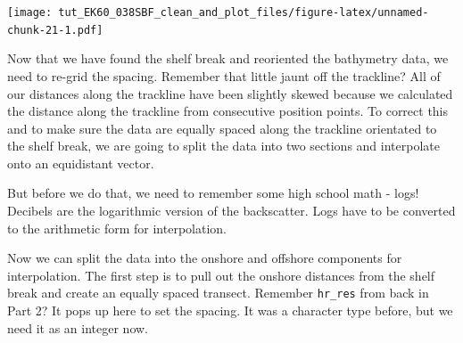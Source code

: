 \documentclass[]{article}
\newenvironment{Shaded}{\begin{snugshade}}{\end{snugshade}}
\newcommand{\CommentTok}[1]{\textcolor[rgb]{0.56,0.35,0.01}{\textit{#1}}}
\newcommand{\DataTypeTok}[1]{\textcolor[rgb]{0.13,0.29,0.53}{#1}}
\newcommand{\DecValTok}[1]{\textcolor[rgb]{0.00,0.00,0.81}{#1}}
\newcommand{\KeywordTok}[1]{\textcolor[rgb]{0.13,0.29,0.53}{\textbf{#1}}}
\newcommand{\NormalTok}[1]{#1}
\newcommand{\OperatorTok}[1]{\textcolor[rgb]{0.81,0.36,0.00}{\textbf{#1}}}
\newcommand{\StringTok}[1]{\textcolor[rgb]{0.31,0.60,0.02}{#1}}
\begin{document}
\texttt{[image: tut\_EK60\_038SBF\_clean\_and\_plot\_files/figure-latex/unnamed-chunk-21-1.pdf]}

Now that we have found the shelf break and reoriented the bathymetry
data, we need to re-grid the spacing. Remember that little jaunt off the
trackline? All of our distances along the trackline have been slightly
skewed because we calculated the distance along the trackline from
consecutive position points. To correct this and to make sure the data
are equally spaced along the trackline orientated to the shelf break, we
are going to split the data into two sections and interpolate onto an
equidistant vector.

 But before we do that, we need to remember some high school math -
logs! Decibels are the logarithmic version of the backscatter. Logs have
to be converted to the arithmetic form for interpolation.

\begin{Shaded}
\end{Shaded}

Now we can split the data into the onshore and offshore components for
interpolation. The first step is to pull out the onshore distances from
the shelf break and create an equally spaced transect. Remember
\texttt{hr\_res} from back in Part 2? It pops up here to set the
spacing. It was a character type before, but we need it as an integer
now.

\begin{Shaded}
\end{Shaded}
\end{document}
